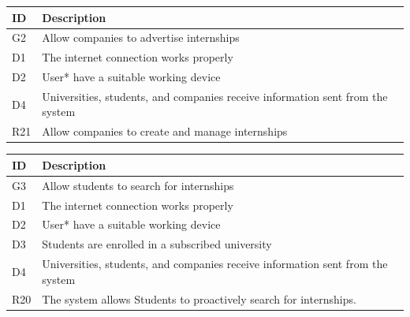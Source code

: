 \begin{center}
    \begin{longtable}{|l|p{13.5cm}|}
        \hline
        \rowcolor[HTML]{5C8A99}
        \textbf{ID} & \textbf{Description} \\ \hline
        \rowcolor[HTML]{E7E0FA} %
        G2 & Allow companies to advertise internships \\ \hline
        \rowcolor[HTML]{FFF9C4} %
        D1 & The internet connection works properly \\ \hline
        \rowcolor[HTML]{FFF9C4} %
        D2 & User* have a suitable working device \\ \hline
        \rowcolor[HTML]{FFF9C4} %
        D4 & Universities, students, and companies receive information sent from the system \\ \hline
        \hline\rowcolor[HTML]{FFDAB9} %
        R21 & Allow companies to create and manage internships \\ \hline
    \end{longtable}
\end{center}

\begin{center}
    \begin{longtable}{|l|p{13.5cm}|}
        \hline
        \rowcolor[HTML]{5C8A99}
        \textbf{ID} & \textbf{Description} \\ \hline
        \rowcolor[HTML]{E7E0FA} %
        G3 & Allow students to search for internships \\ \hline
        \rowcolor[HTML]{FFF9C4} %
        D1 & The internet connection works properly \\ \hline
        \rowcolor[HTML]{FFF9C4} %
        D2 & User* have a suitable working device \\ \hline
        \rowcolor[HTML]{FFF9C4} %
        D3 & Students are enrolled in a subscribed university \\ \hline
        \rowcolor[HTML]{FFF9C4} %
        D4 & Universities, students, and companies receive information sent from the system \\ \hline
        \hline\rowcolor[HTML]{FFDAB9} %
        R20 & The system allows Students to proactively search for internships. \\ \hline
    \end{longtable}
\end{center}

